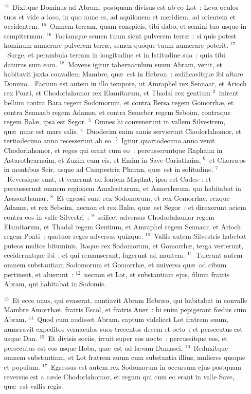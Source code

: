${}^{14}$~Dixitque Dominus ad Abram, postquam divisus est ab eo Lot~: Leva oculos tuos et vide a loco, in quo nunc es, ad aquilonem et meridiem, ad orientem et occidentem.
${}^{15}$~Omnem terram, quam conspicis, tibi dabo, et semini tuo usque in sempiternum.
${}^{16}$~Faciamque semen tuum sicut pulverem terr\ae~: si quis potest hominum numerare pulverem terr\ae , semen quoque tuum numerare poterit.
${}^{17}$~Surge, et perambula terram in longitudine et in latitudine sua~: quia tibi daturus sum eam.
${}^{18}$~Movens igitur tabernaculum suum Abram, venit, et habitavit juxta convallem Mambre, qu\ae\ est in Hebron~: \ae dificavitque ibi altare Domino.
~Factum est autem in illo tempore, ut Amraphel rex Sennaar, et Arioch rex Ponti, et Chodorlahomor rex Elamitarum, et Thadal rex gentium
${}^{2}$~inirent bellum contra Bara regem Sodomorum, et contra Bersa regem Gomorrh\ae , et contra Sennaab regem Adam\ae , et contra Semeber regem Seboim, contraque regem Bal\ae , ipsa est Segor.
${}^{3}$~Omnes hi convenerunt in vallem Silvestrem, qu\ae\ nunc est mare salis.
${}^{4}$~Duodecim enim annis servierunt Chodorlahomor, et tertiodecimo anno recesserunt ab eo.
${}^{5}$~Igitur quartodecimo anno venit Chodorlahomor, et reges qui erant cum eo~: percusseruntque Raphaim in Astarothcarnaim, et Zuzim cum eis, et Emim in Save Cariathaim,
${}^{6}$~et Chorr\ae os in montibus Seir, usque ad Campestria Pharan, qu\ae\ est in solitudine.
${}^{7}$~Reversique sunt, et venerunt ad fontem Misphat, ipsa est Cades~: et percusserunt omnem regionem Amalecitarum, et Amorrh\ae um, qui habitabat in Asasonthamar.
${}^{8}$~Et egressi sunt rex Sodomorum, et rex Gomorrh\ae , rexque Adam\ae , et rex Seboim, necnon et rex Bal\ae , qu\ae\ est Segor~: et direxerunt aciem contra eos in valle Silvestri~:
${}^{9}$~scilicet adversus Chodorlahomor regem Elamitarum, et Thadal regem Gentium, et Amraphel regem Sennaar, et Arioch regem Ponti~: quatuor reges adversus quinque.
${}^{10}$~Vallis autem Silvestris habebat puteos multos bituminis. Itaque rex Sodomorum, et Gomorrh\ae , terga verterunt, cecideruntque ibi~: et qui remanserant, fugerunt ad montem.
${}^{11}$~Tulerunt autem omnem substantiam Sodomorum et Gomorrh\ae , et universa qu\ae\ ad cibum pertinent, et abierunt~:
${}^{12}$~necnon et Lot, et substantiam ejus, filium fratris Abram, qui habitabat in Sodomis.


${}^{13}$~Et ecce unus, qui evaserat, nuntiavit Abram Hebr\ae o, qui habitabat in convalle Mambre Amorrh\ae i, fratris Escol, et fratris Aner~: hi enim pepigerant fœdus cum Abram.
${}^{14}$~Quod cum audisset Abram, captum videlicet Lot fratrem suum, numeravit expeditos vernaculos suos trecentos decem et octo~: et persecutus est usque Dan.
${}^{15}$~Et divisis sociis, irruit super eos nocte~: percussitque eos, et persecutus est eos usque Hoba, qu\ae\ est ad l\ae vam Damasci.
${}^{16}$~Reduxitque omnem substantiam, et Lot fratrem suum cum substantia illius, mulieres quoque et populum.
${}^{17}$~Egressus est autem rex Sodomorum in occursum ejus postquam reversus est a c\ae de Chodorlahomor, et regum qui cum eo erant in valle Save, qu\ae\ est vallis regis.


